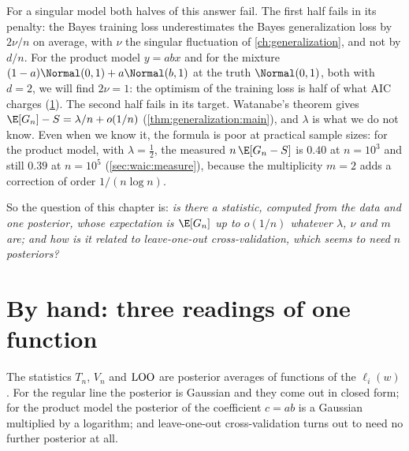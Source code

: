 \begin{refsection}
For a singular model both halves of this answer fail. The first half fails in its penalty: the Bayes training loss underestimates the Bayes generalization loss by $2\nu/n$ on average, with $\nu$ the singular fluctuation of \cref{ch:generalization}, and not by $d/n$. For the product model $y=abx$ and for the mixture $(1-a)\Normal(0,1)+a\Normal(b,1)$ at the truth $\Normal(0,1)$, both with $d=2$, we will find $2\nu=1$: the optimism of the training loss is half of what AIC charges (\cref{sec:waic:byhand}). The second half fails in its target. Watanabe's theorem gives $\E[G_n]-S=\lambda/n+o(1/n)$ (\cref{thm:generalization:main}), and $\lambda$ is what we do not know. Even when we know it, the formula is poor at practical sample sizes: for the product model, with $\lambda=\tfrac12$, the measured $n\,\E[G_n-S]$ is $0.40$ at $n=10^3$ and still $0.39$ at $n=10^5$ (\cref{sec:waic:measure}), because the multiplicity $m=2$ adds a correction of order $1/(n\log n)$.

So the question of this chapter is: \emph{is there a statistic, computed from the data and one posterior, whose expectation is $\E[G_n]$ up to $o(1/n)$ whatever $\lambda$, $\nu$ and $m$ are; and how is it related to leave-one-out cross-validation, which seems to need $n$ posteriors?}

\section{By hand: three readings of one function}\label{sec:waic:byhand}

The statistics $T_n$, $V_n$ and $\mathrm{LOO}$ are posterior averages of functions of the $\ell_i(w)$. For the regular line the posterior is Gaussian and they come out in closed form; for the product model the posterior of the coefficient $c=ab$ is a Gaussian multiplied by a logarithm; and leave-one-out cross-validation turns out to need no further posterior at all.


\end{refsection}

